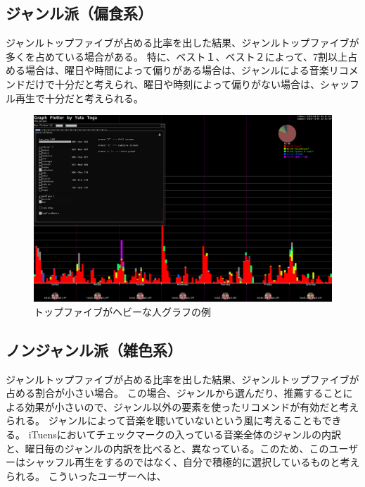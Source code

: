 \documentclass{jsarticle}
\begin{document}
\subsection{ジャンル派（偏食系）}
ジャンルトップファイブが占める比率を出した結果、ジャンルトップファイブが多くを占めている場合がある。
特に、ベスト１、ベスト２によって、7割以上占める場合は、曜日や時間によって偏りがある場合は、ジャンルによる音楽リコメンドだけで十分だと考えられ、曜日や時刻によって偏りがない場合は、シャッフル再生で十分だと考えられる。
\begin{figure}[h]
\begin{center}
\includegraphics[width=14cm]{topFive_heavy.png}
\caption{トップファイブがヘビーな人グラフの例}
\label{topFive_heavy}
\end{center}
\end{figure}

\subsection{ノンジャンル派（雑色系）}
ジャンルトップファイブが占める比率を出した結果、ジャンルトップファイブが占める割合が小さい場合。
この場合、ジャンルから選んだり、推薦することによる効果が小さいので、ジャンル以外の要素を使ったリコメンドが有効だと考えられる。
ジャンルによって音楽を聴いていないという風に考えることもできる。
iTuensにおいてチェックマークの入っている音楽全体のジャンルの内訳と、曜日毎のジャンルの内訳を比べると、異なっている。このため、このユーザーはシャッフル再生をするのではなく、自分で積極的に選択しているものと考えられる。
こういったユーザーへは、
\end{document}
